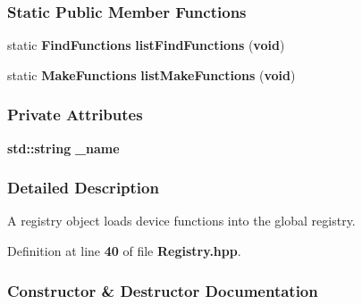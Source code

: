 \subsubsection*{Static Public Member Functions}
\begin{DoxyCompactItemize}
\item 
static {\bf Find\+Functions} {\bf list\+Find\+Functions} ({\bf void})
\item 
static {\bf Make\+Functions} {\bf list\+Make\+Functions} ({\bf void})
\end{DoxyCompactItemize}
\subsubsection*{Private Attributes}
\begin{DoxyCompactItemize}
\item 
{\bf std\+::string} {\bf \+\_\+name}
\end{DoxyCompactItemize}


\subsubsection{Detailed Description}
A registry object loads device functions into the global registry. 

Definition at line {\bf 40} of file {\bf Registry.\+hpp}.



\subsubsection{Constructor \& Destructor Documentation}
